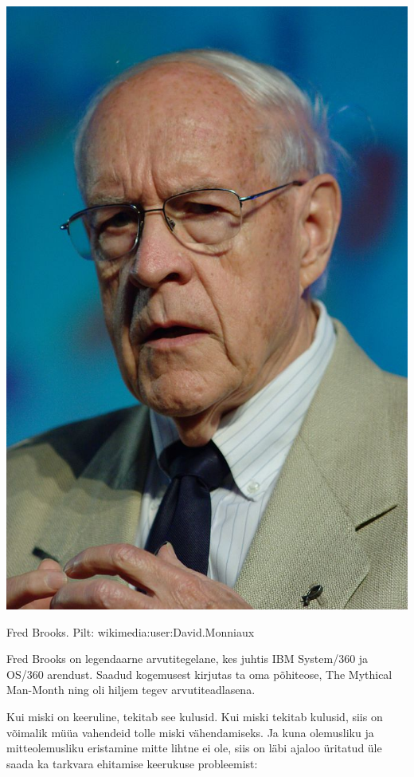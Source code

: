 \documentclass{tufte-book}
\begin{document}
\begin{marginfigure}
		\begin{center}
		\includegraphics[width=.7\linewidth]{682px-Frederick_Brooks_IMG_2279.jpg}
		\caption{Fred Brooks. Pilt: wikimedia:user:David.Monniaux}
		\label{fig:brooks}
		\end{center}
		Fred Brooks on legendaarne arvutitegelane, kes juhtis IBM System/360 ja OS/360 arendust. Saadud kogemusest kirjutas ta oma põhiteose, The Mythical Man-Month ning oli hiljem tegev arvutiteadlasena. 
\end{marginfigure}

Kui miski on keeruline, tekitab see kulusid. Kui miski tekitab kulusid, siis on võimalik müüa vahendeid tolle miski vähendamiseks. Ja kuna olemusliku ja mitteolemusliku eristamine mitte lihtne ei ole, siis on läbi ajaloo üritatud üle saada ka tarkvara ehitamise keerukuse probleemist:
\end{document}
